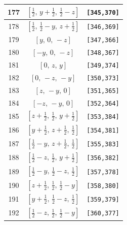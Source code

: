 \documentclass[fleqn,8pt]{jsarticle}
\begin{document}
\begin{longtable}{ccc}
177 & $\left[ \frac{1}{2},\, y + \frac{1}{2},\, \frac{1}{2} - z \right]$ & {\tt [345,370]} \\ \hline
178 & $\left[ \frac{1}{2},\, \frac{1}{2} - y,\, z + \frac{1}{2} \right]$ & {\tt [346,369]} \\ \hline
179 & $\left[ y,\, 0,\, - z \right]$ & {\tt [347,366]} \\ \hline
180 & $\left[ - y,\, 0,\, - z \right]$ & {\tt [348,367]} \\ \hline
181 & $\left[ 0,\, z,\, y \right]$ & {\tt [349,374]} \\ \hline
182 & $\left[ 0,\, - z,\, - y \right]$ & {\tt [350,373]} \\ \hline
183 & $\left[ z,\, - y,\, 0 \right]$ & {\tt [351,365]} \\ \hline
184 & $\left[ - z,\, - y,\, 0 \right]$ & {\tt [352,364]} \\ \hline
185 & $\left[ z + \frac{1}{2},\, \frac{1}{2},\, y + \frac{1}{2} \right]$ & {\tt [353,384]} \\ \hline
186 & $\left[ y + \frac{1}{2},\, z + \frac{1}{2},\, \frac{1}{2} \right]$ & {\tt [354,381]} \\ \hline
187 & $\left[ \frac{1}{2} - y,\, z + \frac{1}{2},\, \frac{1}{2} \right]$ & {\tt [355,383]} \\ \hline
188 & $\left[ \frac{1}{2} - z,\, \frac{1}{2},\, y + \frac{1}{2} \right]$ & {\tt [356,382]} \\ \hline
189 & $\left[ \frac{1}{2} - y,\, \frac{1}{2} - z,\, \frac{1}{2} \right]$ & {\tt [357,378]} \\ \hline
190 & $\left[ z + \frac{1}{2},\, \frac{1}{2},\, \frac{1}{2} - y \right]$ & {\tt [358,380]} \\ \hline
191 & $\left[ y + \frac{1}{2},\, \frac{1}{2} - z,\, \frac{1}{2} \right]$ & {\tt [359,379]} \\ \hline
192 & $\left[ \frac{1}{2} - z,\, \frac{1}{2},\, \frac{1}{2} - y \right]$ & {\tt [360,377]} \\
\end{longtable}
\renewcommand{\arraystretch}{1.2}
\end{document}

